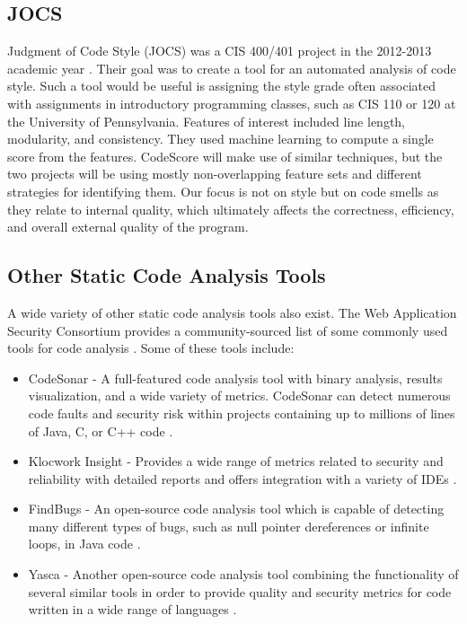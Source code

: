 \documentclass{sig-alternate}
\begin{document}
\subsection{JOCS}
Judgment of Code Style (JOCS) was a CIS 400/401 project in the 2012-2013
academic year \cite{close2013jocs}. Their goal was to create a tool for an automated
analysis of code style. Such a tool would be useful is assigning the style grade
often associated with assignments in introductory programming classes, such as
CIS 110 or 120 at the University of Pennsylvania. Features of interest included
line length, modularity, and consistency. They used machine learning to compute
a single score from the features. CodeScore will make use of similar techniques,
but the two projects will be using mostly non-overlapping feature sets and
different strategies for identifying them. Our focus is not on style but on code
smells as they relate to internal quality, which ultimately affects the
correctness, efficiency, and overall external quality of the program. 

\subsection{Other Static Code Analysis Tools}
A wide variety of other static code analysis tools also exist. The Web Application Security Consortium provides a community-sourced list of some commonly used tools for code analysis \cite{webappsec2012}. Some of these tools include:

\begin{itemize}
	\item CodeSonar - A full-featured code analysis tool with binary analysis, results visualization, and a wide variety of metrics. CodeSonar can detect numerous code faults and security risk within projects containing up to millions of lines of Java, C, or C++ code \cite{grammatech2013codesonar}.
	\item Klocwork Insight - Provides a wide range of metrics related to security and reliability with detailed reports and offers integration with a variety of IDEs \cite{klocwork2013insight}.
	\item FindBugs - An open-source code analysis tool which is capable of detecting many different types of bugs, such as null pointer dereferences or infinite loops, in Java code \cite{pugh2013findbugs}.
	\item Yasca - Another open-source code analysis tool combining the functionality of several similar tools in order to provide quality and security metrics for code written in a wide range of languages \cite{scovetta2007yasca}.
\end{itemize}
\end{document}
